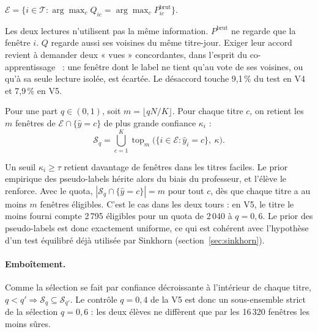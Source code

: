 \begin{definition}
$\mathcal{E}=\{i\in\mathcal{T} : \arg\max_c Q_{ic}=\arg\max_c P^{\text{brut}}_{ic}\}$.
\end{definition}
\noindent Les deux lectures n'utilisent pas la même information. $P^{\text{brut}}$ ne regarde que la fenêtre $i$. $Q$ regarde aussi ses voisines du même titre-jour. Exiger leur accord revient à demander deux « vues » concordantes, dans l'esprit du co-apprentissage~\cite{blum} : une fenêtre dont le label ne tient qu'au vote de ses voisines, ou qu'à sa seule lecture isolée, est écartée. Le désaccord touche 9,1\,\% du test en V4 et 7,9\,\% en V5.

\begin{definition}
Pour une part $q\in(0,1)$, soit $m=\lfloor qN/K\rfloor$. Pour chaque titre $c$, on retient les $m$ fenêtres de $\mathcal{E}\cap\{\hat y=c\}$ de plus grande confiance $\kappa_i$ :
\begin{equation}
\mathcal{S}_q=\bigcup_{c=1}^{K}\operatorname{top}_m\big(\{i\in\mathcal{E} : \hat y_i=c\},\ \kappa\big).
\end{equation}
\end{definition}

\begin{remarque}
Un seuil $\kappa_i\ge\tau$ retient davantage de fenêtres dans les titres faciles. Le prior empirique des pseudo-labels hérite alors du biais du professeur, et l'élève le renforce. Avec le quota, $|\mathcal{S}_q\cap\{\hat y=c\}|=m$ pour tout $c$, dès que chaque titre a au moins $m$ fenêtres éligibles. C'est le cas dans les deux tours : en V5, le titre le moins fourni compte 2\,795 éligibles pour un quota de 2\,040 à $q=0{,}6$. Le prior des pseudo-labels est donc exactement uniforme, ce qui est cohérent avec l'hypothèse d'un test équilibré déjà utilisée par Sinkhorn (section~\ref{sec:sinkhorn}).
\end{remarque}

\paragraph{Emboîtement.} Comme la sélection se fait par confiance décroissante à l'intérieur de chaque titre, $q<q'\Rightarrow\mathcal{S}_q\subseteq\mathcal{S}_{q'}$. Le contrôle $q=0{,}4$ de la V5 est donc un sous-ensemble strict de la sélection $q=0{,}6$ : les deux élèves ne diffèrent que par les 16\,320 fenêtres les moins sûres.


